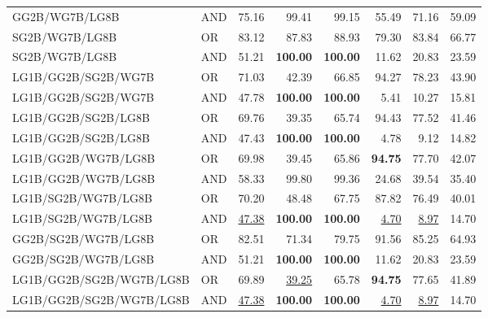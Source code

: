 \documentclass{article}
\begin{document}
{\begin{longtable}{llrrrrrr}
 GG2B/WG7B/LG8B           & AND     & 75.16             & 99.41             & 99.15             & 55.49            & 71.16            & 59.09             \\
 SG2B/WG7B/LG8B           & OR      & 83.12             & 87.83             & 88.93             & 79.30            & 83.84            & 66.77             \\
 SG2B/WG7B/LG8B           & AND     & 51.21             & \textbf{100.00}   & \textbf{100.00}   & 11.62            & 20.83            & 23.59             \\
 LG1B/GG2B/SG2B/WG7B      & OR      & 71.03             & 42.39             & 66.85             & 94.27            & 78.23            & 43.90             \\
 LG1B/GG2B/SG2B/WG7B      & AND     & 47.78             & \textbf{100.00}   & \textbf{100.00}   & 5.41             & 10.27            & 15.81             \\
 LG1B/GG2B/SG2B/LG8B      & OR      & 69.76             & 39.35             & 65.74             & 94.43            & 77.52            & 41.46             \\
 LG1B/GG2B/SG2B/LG8B      & AND     & 47.43             & \textbf{100.00}   & \textbf{100.00}   & 4.78             & 9.12             & 14.82             \\
 LG1B/GG2B/WG7B/LG8B      & OR      & 69.98             & 39.45             & 65.86             & \textbf{94.75}   & 77.70            & 42.07             \\
 LG1B/GG2B/WG7B/LG8B      & AND     & 58.33             & 99.80             & 99.36             & 24.68            & 39.54            & 35.40             \\
 LG1B/SG2B/WG7B/LG8B      & OR      & 70.20             & 48.48             & 67.75             & 87.82            & 76.49            & 40.01             \\
 LG1B/SG2B/WG7B/LG8B      & AND     & \underline{47.38} & \textbf{100.00}   & \textbf{100.00}   & \underline{4.70} & \underline{8.97} & 14.70             \\
 GG2B/SG2B/WG7B/LG8B      & OR      & 82.51             & 71.34             & 79.75             & 91.56            & 85.25            & 64.93             \\
 GG2B/SG2B/WG7B/LG8B      & AND     & 51.21             & \textbf{100.00}   & \textbf{100.00}   & 11.62            & 20.83            & 23.59             \\
 LG1B/GG2B/SG2B/WG7B/LG8B & OR      & 69.89             & \underline{39.25} & 65.78             & \textbf{94.75}   & 77.65            & 41.89             \\
 LG1B/GG2B/SG2B/WG7B/LG8B & AND     & \underline{47.38} & \textbf{100.00}   & \textbf{100.00}   & \underline{4.70} & \underline{8.97} & 14.70             \\

\end{longtable}
}
\end{document}
